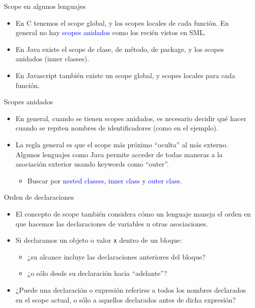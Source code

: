 \documentclass{beamer} %
\newcommand{\blue}[1]{\textcolor{blue}{#1}}
\begin{document}
\begin{frame}{Scope en algunos lenguajes}
    \begin{itemize}
        \item En C tenemos el scope global, y los scopes locales de cada función. En general no hay \blue{scopes anidados} como los recién vistos en SML.
        \item En Java existe el scope de clase, de método, de package, y los scopes anidados (inner classes).
        \item En Javascript también existe un scope global, y scopes locales para cada función.
    \end{itemize}
\end{frame}

\begin{frame}{Scopes anidados}
    \begin{itemize}
        \item En general, cuando se tienen scopes anidados, es necesario decidir qué hacer cuando se repiten nombres de identificadores (como en el ejemplo).
        \item La regla general es que el scope más próximo ``oculta'' al más externo. Algunos lenguajes como Java permite acceder de todas maneras a la asociación exterior usando keywords como ``outer''.
        \begin{itemize}
            \item Buscar por \blue{nested classes}, \blue{inner class} y \blue{outer class}.
        \end{itemize}
    \end{itemize}
\end{frame}

\begin{frame}{Orden de declaraciones}
    \begin{itemize}
        \item<1-> El concepto de scope también considera cómo un lenguaje maneja el orden en que hacemos las declaraciones de variables u otras asociaciones.
        \item<2-> Si declaramos un objeto o valor \texttt{x} dentro de un bloque:
        \begin{itemize}
            \item ¿su alcance incluye las declaraciones anteriores del bloque?
            \item ¿o sólo desde su declaración hacia ``adelante''?
        \end{itemize}
        \item<3-> ¿Puede una declaración o expresión referirse a todos los nombres declarados en el scope actual, o sólo a aquellos declarados antes de dicha expresión?
    \end{itemize}
\end{frame}
\end{document}
